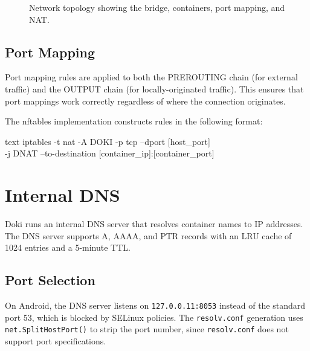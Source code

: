 \begin{figure}[htbp]
  \caption{Network topology showing the bridge, containers, port mapping, and NAT.}
  \label{fig:network-topology}
\end{figure}

\subsection{Port Mapping}
\label{sec:port-mapping}

Port mapping rules are applied to both the PREROUTING chain (for
external traffic) and the OUTPUT chain (for locally-originated
traffic). This ensures that port mappings work correctly regardless
of where the connection originates.

The nftables implementation constructs rules in the following format:

\begin{codebox}[title={Port mapping rule structure}]{text}
iptables -t nat -A DOKI -p tcp --dport [host\_port] \\
  -j DNAT --to-destination [container\_ip]:[container\_port]
\end{codebox}

\section{Internal DNS}
\label{sec:internal-dns}

Doki runs an internal DNS server that resolves container names to IP
addresses. The DNS server supports A, AAAA, and PTR records with an
LRU cache of 1024 entries and a 5-minute TTL.

\subsection{Port Selection}
\label{sec:dns-port}

On Android, the DNS server listens on \texttt{127.0.0.11:8053}
instead of the standard port 53, which is blocked by SELinux policies.
The \texttt{resolv.conf} generation uses
\texttt{net.SplitHostPort()} to strip the port number, since
\texttt{resolv.conf} does not support port specifications.

